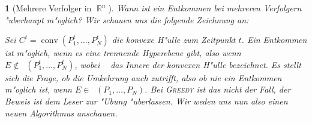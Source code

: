 \documentclass[paper=A4, twoside, chapterprefix=true, bibliography=totoc, headsepline]{scrbook}
\newcommand{\tikzgitter}[3][0.25]{ %
	\draw[step=#1,gray!15] #2 grid #3;
	\draw[step=2*#1,gray!30] #2 grid #3;
	\fill (0,0) circle(0.1); 
}
\DeclareMathOperator{\R}{\mathbb{R}}
\DeclareMathOperator{\conv}{conv} %
\DeclareMathOperator{\convo}{\stackrel{\circ}{\conv}} %
\newcommand{\kapit}[1]{\textsc{#1}\xspace} %
\newcommand{\Greedy}{\kapit{Greedy}}
\theoremstyle{nonumberbreak}
\theoremstyle{emptybreak}
\newtheorem{emptythm}{}%
\theoremstyle{break}
\begin{document}
\begin{emptythm}[Mehrere Verfolger in $\R^n$]
Wann ist ein Entkommen bei mehreren Verfolgern "uberhaupt m"oglich? Wir schauen uns die folgende Zeichnung an:
\begin{center}\end{center}
Sei $C^t = \conv(P_1^t, \ldots, P_N^t)$ die konvexe H"ulle zum Zeitpunkt $t$.
Ein Entkommen ist m"oglich, wenn es eine trennende Hyperebene gibt, also wenn $E \notin \convo(P_1^t, \ldots, P_N^t)$, wobei $\convo$ das Innere der konvexen H"ulle bezeichnet.
Es stellt sich die Frage, ob die Umkehrung auch zutrifft, also ob nie ein Entkommen m"oglich ist, wenn $E \in \convo(P_1, \ldots, P_N)$.
Bei \Greedy ist das nicht der Fall, der Beweis ist dem Leser zur "Ubung "uberlassen.
Wir weden uns nun also einen neuen Algorithmus anschauen.
\end{emptythm}
\end{document}
